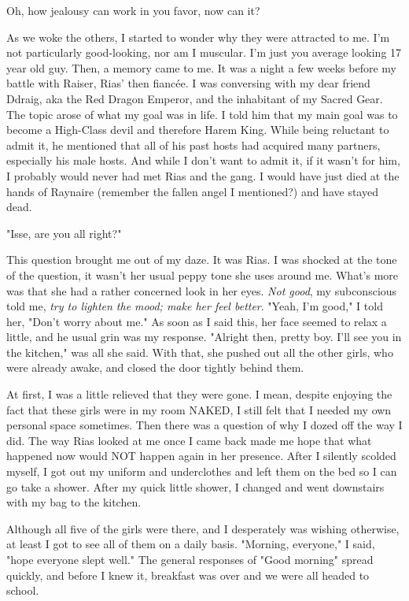 \documentclass{article}
\begin{document}
Oh, how jealousy can work in you favor, now can it?

As we woke the others, I started to wonder why they were attracted to me. I'm not particularly good-looking, nor am I muscular. I'm just you average looking 17 year old guy. Then, a memory came to me. It was a night a few weeks before my battle with Raiser, Rias' then fiancée. I was conversing with my dear friend Ddraig, aka the Red Dragon Emperor, and the inhabitant of my Sacred Gear. The topic arose of what my goal was in life. I told him that my main goal was to become a High-Class devil and therefore Harem King. While being reluctant to admit it, he mentioned that all of his past hosts had acquired many partners, especially his male hosts. And while I don't want to admit it, if it wasn't for him, I probably would never had met Rias and the gang. I would have just died at the hands of Raynaire (remember the fallen angel I mentioned?) and have stayed dead.

"Isse, are you all right?"

This question brought me out of my daze. It was Rias. I was shocked at the tone of the question, it wasn't her usual peppy tone she uses around me. What's more was that she had a rather concerned look in her eyes. \emph{Not good}, my subconscious told me, \emph{try to lighten the mood; make her feel better}. "Yeah, I'm good," I told her, "Don't worry about me." As soon as I said this, her face seemed to relax a little, and he usual grin was my response. "Alright then, pretty boy. I'll see you in the kitchen," was all she said. With that, she pushed out all the other girls, who were already awake, and closed the door tightly behind them.

At first, I was a little relieved that they were gone. I mean, despite enjoying the fact that these girls were in my room NAKED, I still felt that I needed my own personal space sometimes. Then there was a question of why I dozed off the way I did. The way Rias looked at me once I came back made me hope that what happened now would NOT happen again in her presence. After I silently scolded myself, I got out my uniform and underclothes and left them on the bed so I can go take a shower. After my quick little shower, I changed and went downstairs with my bag to the kitchen.

Although all five of the girls were there, and I desperately was wishing otherwise, at least I got to see all of them on a daily basis. "Morning, everyone," I said, "hope everyone slept well." The general responses of "Good morning" spread quickly, and before I knew it, breakfast was over and we were all headed to school.
\end{document}
